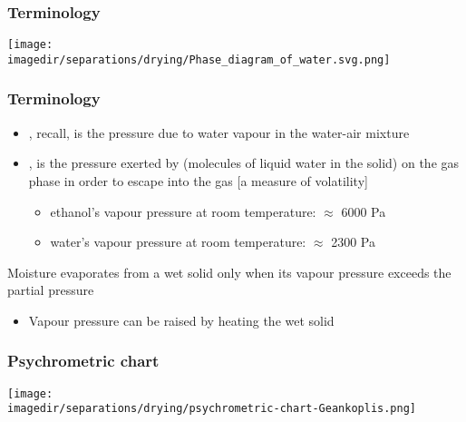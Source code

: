 \begin{frame}\frametitle{Terminology}
	\begin{center}
		\texttt{[image: \\imagedir/separations/drying/Phase\_diagram\_of\_water.svg.png]}
	\end{center}

\end{frame}

\begin{frame}\frametitle{Terminology}
	\begin{itemize}
		\item	{\color{purple}{Partial pressure}}, recall, is the pressure due to water vapour in the water-air mixture
		\item	{\color{purple}{Vapour pressure}}, is the pressure exerted by (molecules of liquid water in the solid) on the gas phase in order to escape into the gas [a measure of volatility]
		\begin{itemize}
			\item	ethanol's vapour pressure at room temperature: $\approx$ 6000 Pa
			\item	water's vapour pressure at room temperature: $\approx$ 2300 Pa
		\end{itemize}
	\end{itemize}
	\begin{exampleblock}{}
		Moisture evaporates from a wet solid only when its vapour pressure exceeds the partial pressure
	\end{exampleblock}
	\begin{itemize}
		\item	Vapour pressure can be raised by heating the wet solid
	\end{itemize}
\end{frame}

\begin{frame}\frametitle{Psychrometric chart}
	\vfill
	\begin{center}
		\texttt{[image: \\imagedir/separations/drying/psychrometric-chart-Geankoplis.png]}
	\end{center}
\end{frame}


